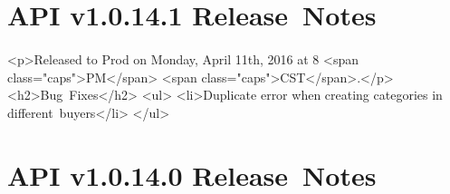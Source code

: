 \documentclass{memoir}%
\begin{document}
%
\section*{API v1.0.14.1 Release~Notes}%
\paragraph*{}%

%
\paragraph*{}%
<p>Released to Prod on Monday, April 11th, 2016 at 8 <span class="caps">PM</span> <span class="caps">CST</span>.</p>\newline%
<h2>Bug~Fixes</h2>\newline%
<ul>\newline%
<li>Duplicate error when creating categories in different~buyers</li>\newline%
</ul>

%
\section*{API v1.0.14.0 Release~Notes}%
\paragraph*{}%

%
\end{document}
